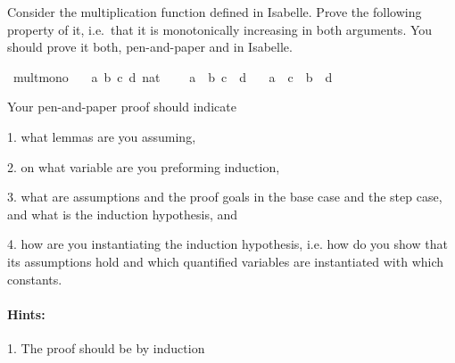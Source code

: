 \begin{isabellebody}
\begin{isamarkuptext}
\end{isamarkuptext}\isamarkuptrue%
%
\isadelimproof
%
\endisadelimproof
%
\isatagproof
%
\endisatagproof
{\isafoldproof}%
%
\isadelimproof
%
\endisadelimproof
%
\begin{isamarkuptext}%
%
\end{isamarkuptext}\isamarkuptrue%
%
\begin{isamarkuptext}%
Consider the multiplication function \isa{{\isacharparenleft}{\kern0pt}{\isacharasterisk}{\kern0pt}{\isacharparenright}{\kern0pt}} defined in Isabelle. Prove the following
      property of it, i.e.\ that it is monotonically increasing in both arguments. You should prove
      it both, pen-and-paper and in Isabelle.%
\end{isamarkuptext}\isamarkuptrue%
\isamarkupfalse%
\ mult{\isacharunderscore}{\kern0pt}mono{\isacharcolon}{\kern0pt}\isanewline
\ \ \ a\ b\ c\ d{\isacharcolon}{\kern0pt}{\isacharcolon}{\kern0pt}\ nat\ %
\isanewline
\ \ \ {\isachardoublequoteopen}a\ {\isasymle}\ b{\isachardoublequoteclose}\ {\isachardoublequoteopen}c\ {\isasymle}\ d{\isachardoublequoteclose}\isanewline
\ \ \ {\isachardoublequoteopen}a\ {\isacharasterisk}{\kern0pt}\ c\ {\isasymle}\ b\ {\isacharasterisk}{\kern0pt}\ d{\isachardoublequoteclose}%
\begin{isamarkuptext}%
Your pen-and-paper proof should indicate

 1. what lemmas are you assuming,

 2. on what variable are you preforming induction,

 3. what are assumptions and the proof goals in the base case and the step case, and what is the
    induction hypothesis, and

 4. how are you instantiating the induction hypothesis, i.e. how do you show that its assumptions
    hold and which quantified variables are instantiated with which constants.

\paragraph{Hints:}
 1. The proof should be by induction


\end{isamarkuptext}
\end{isabellebody}
